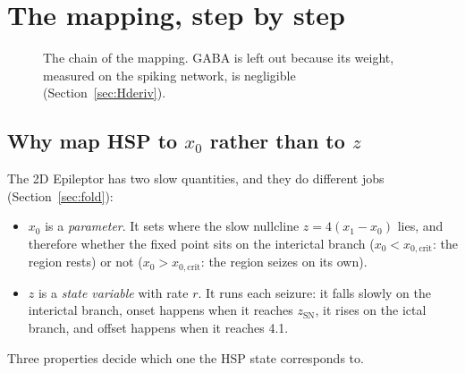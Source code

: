 \documentclass[11pt]{article}
\newcommand{\kA}{k_A}
\newcommand{\xc}{x_{0,\mathrm{crit}}}
\newcommand{\zsn}{z_{\mathrm{SN}}}
\begin{document}
\section{The mapping, step by step}
\begin{figure}[H]\centering
{}
\caption{The chain of the mapping. GABA is left out because its weight, measured on the spiking network, is
negligible (Section~\ref{sec:Hderiv}).}
\end{figure}

\subsection{Why map HSP to $x_0$ rather than to $z$}\label{sec:why}
The 2D Epileptor has two slow quantities, and they do different jobs (Section~\ref{sec:fold}):
\begin{itemize}
\item $x_0$ is a \emph{parameter}. It sets where the slow nullcline $z=4(x_1-x_0)$ lies, and therefore whether the fixed
point sits on the interictal branch ($x_0<\xc$: the region rests) or not ($x_0>\xc$: the region seizes on its own).
\item $z$ is a \emph{state variable} with rate $r$. It runs each seizure: it falls slowly on the interictal branch, onset
happens when it reaches $\zsn$, it rises on the ictal branch, and offset happens when it reaches 4.1.
\end{itemize}
Three properties decide which one the HSP state corresponds to.
\end{document}
